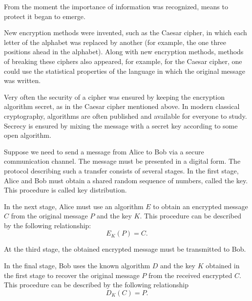 From the moment the importance of information was recognized, means to protect it began to emerge. 

New encryption methods were invented, such as the Caesar cipher, in which each letter
of the alphabet was replaced by another (for example, the one three positions ahead in
the alphabet). Along with new encryption methods, methods of breaking these ciphers also appeared, for example, for the Caesar cipher, one could
use the statistical properties of the language in which
the original message was written.

Very often the security of a cipher was ensured by keeping the encryption algorithm secret, as in the
Caesar cipher mentioned above. In modern classical
cryptography, algorithms are
often published and available for everyone to study. Secrecy
is ensured by mixing the message with a secret key
according to some open algorithm. 

Suppose we need to send a message from Alice to Bob via
a secure communication channel. The message must be
presented in a digital form.
The protocol describing such
a transfer consists of several stages. In the first stage, Alice and Bob must
obtain a shared random sequence of numbers, called the key. This procedure is called key distribution. 

In the next stage, Alice must use
an algorithm $E$ to obtain an encrypted message $C$ from the original message $P$ and the key $K$.
This procedure can be described by the following
relationship: 
\begin{equation}
E_{K}\left(P\right) = C.
\label{eqPart3CryptoEncryptClass}
\end{equation}

At the third stage, the obtained encrypted message must be
transmitted to Bob.

In the final stage, Bob uses the known algorithm $D$ and the key $K$ obtained in
the first stage to recover the original message $P$ from
the received encrypted $C$. This procedure can be described
by the following relationship
\begin{equation}
D_{K}\left(C\right) = P.
\label{eqPart3CryptoDeEncryptClass}
\end{equation}

